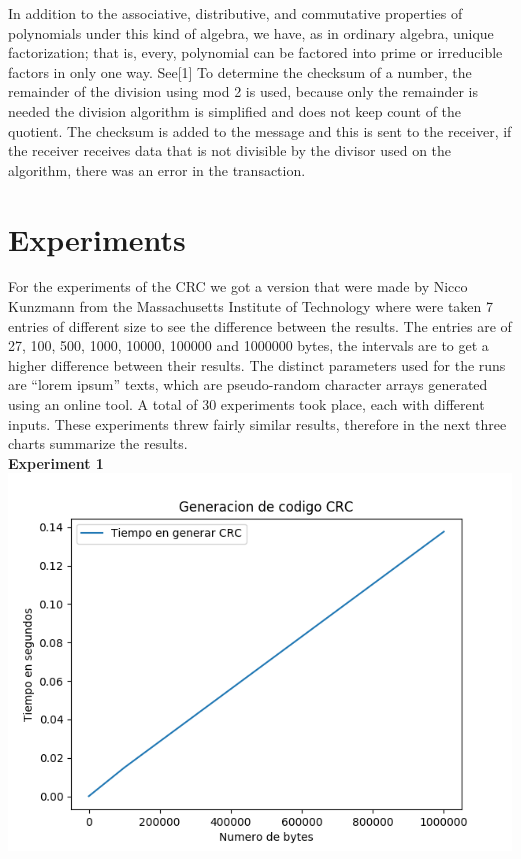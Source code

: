 \documentclass[10pt,twocolumn,letterpaper]{article}
\begin{document}
In addition to the associative, distributive, and commutative properties of polynomials under this kind of algebra, we have, as in ordinary algebra, unique factorization; that is, every, polynomial can be factored into prime or irreducible factors in only one way. See[1]
To determine the checksum of a number, the remainder of the division using mod 2 is used, because only the remainder is needed the division algorithm is simplified and does not keep count of the quotient. The checksum is added to the message and this is sent to the receiver, if the receiver receives data that is not divisible by the divisor used on the algorithm, there was an error in the transaction. 
\section{Experiments}
For the experiments of the CRC we got a version that were made by Nicco Kunzmann from the Massachusetts Institute of Technology where were taken 7 entries of different size to see the difference between the results.
The entries are of 27, 100, 500, 1000, 10000, 100000 and 1000000 bytes, the intervals are to get a higher difference between their results.
The distinct parameters used for the runs are “lorem ipsum” texts, which are pseudo-random character arrays generated using an online tool.
A total of 30 experiments took place, each with different inputs. These experiments threw fairly similar results, therefore in the next three charts summarize the results. \\
\textbf{Experiment 1}\\
\includegraphics[scale=0.4]{figura1.png}
\end{document}
